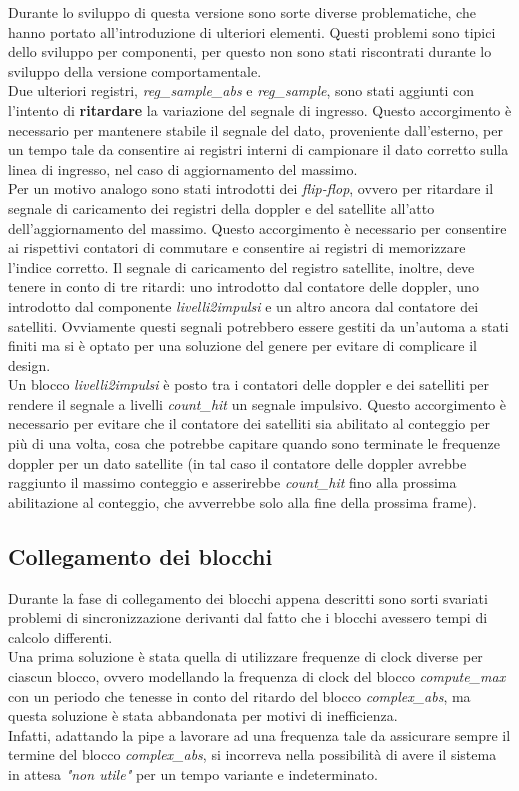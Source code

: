 \documentclass[12pt,a4paper,twoside,openany]{book}
\begin{document}
Durante lo sviluppo di questa versione sono sorte diverse problematiche, che hanno portato all'introduzione di ulteriori elementi. Questi problemi sono tipici dello sviluppo per componenti, per questo non sono stati riscontrati durante lo sviluppo della versione comportamentale. \\
Due ulteriori registri, \textit{reg\_sample\_abs} e \textit{reg\_sample}, sono stati aggiunti con l'intento di \textbf{ritardare} la variazione del segnale di ingresso. Questo accorgimento è necessario per mantenere stabile il segnale del dato, proveniente dall'esterno, per un tempo tale da consentire ai registri interni di campionare il dato corretto sulla linea di ingresso, nel caso di aggiornamento del massimo.\\
Per un motivo analogo sono stati introdotti dei \textit{flip-flop}, ovvero per ritardare il segnale di caricamento dei registri della doppler e del satellite all'atto dell'aggiornamento del massimo. Questo accorgimento è necessario per consentire ai rispettivi contatori di commutare e consentire ai registri di memorizzare l'indice corretto. Il segnale di caricamento del registro satellite, inoltre, deve tenere in conto di tre ritardi: uno introdotto dal contatore delle doppler, uno introdotto dal componente \textit{livelli2impulsi} e un altro ancora dal contatore dei satelliti. Ovviamente questi segnali potrebbero essere gestiti da un'automa a stati finiti ma si è optato per una soluzione del genere per evitare di complicare il design.\\
Un blocco \textit{livelli2impulsi} è posto tra i contatori delle doppler e dei satelliti per rendere il segnale a livelli \textit{count\_hit} un segnale impulsivo. Questo accorgimento è necessario per evitare che il contatore dei satelliti sia abilitato al conteggio per più di una volta, cosa che potrebbe capitare quando sono terminate le frequenze doppler per un dato satellite (in tal caso il contatore delle doppler avrebbe raggiunto il massimo conteggio e asserirebbe \textit{count\_hit} fino alla prossima abilitazione al conteggio, che avverrebbe solo alla fine della prossima frame).\\
\clearpage
\subsection{Collegamento dei blocchi}
Durante la fase di collegamento dei blocchi appena descritti sono sorti svariati problemi di sincronizzazione derivanti dal fatto che i blocchi avessero tempi di calcolo differenti.\\
Una prima soluzione è stata quella di utilizzare frequenze di clock diverse per ciascun blocco, ovvero modellando la frequenza di clock del blocco \textit{compute\_max} con un periodo che tenesse in conto del ritardo del blocco \textit{complex\_abs}, ma questa soluzione è stata abbandonata per motivi di inefficienza.\\
Infatti, adattando la pipe a lavorare ad una frequenza tale da assicurare sempre il termine del blocco \textit{complex\_abs}, si incorreva nella possibilità di avere il sistema in attesa \textit{"non utile"} per un tempo variante e indeterminato.\\
\end{document}
